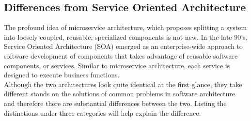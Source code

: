 \documentclass{Configuration_Files/PoliMi3i_thesis}
\begin{document}
\subsection{Differences from Service Oriented Architecture}
\label{subsec:diff}

The profound idea of microservice architecture, which proposes splitting a system into loosely-coupled, reusable, specialized components is not new.
In the late 90's, Service Oriented Architecture (SOA) emerged as an enterprise-wide approach to software development of components that takes advantage of reusable software components, or services.
Similar to microservice architecture, each service is designed to execute business functions.
\\
Although the two architectures look quite identical at the first glance, they take different stands on the solutions of common problems in software architecture and therefore there are substantial differences between the two.
Listing the distinctions under three categories will help explain the difference.
\end{document}
